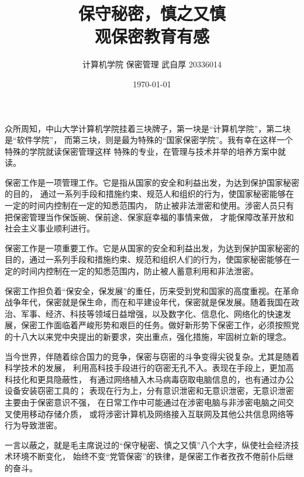 \documentclass[12pt]{article}
\title{\huge\textbf{保守秘密，慎之又慎} \\ \Large{观保密教育有感}}
\author{计算机学院 \hspace{1em} 保密管理 \hspace{1em} 武自厚 \hspace{1em} 20336014}
\date{\today}
\begin{document}
\maketitle

众所周知，中山大学计算机学院挂着三块牌子，第一块是“计算机学院”，第二块是“软件学院”，
而第三块，则是最为特殊的“国家保密学院”。我有幸在这样一个特殊的学院就读保密管理这样
特殊的专业，在管理与技术并举的培养方案中就读。

保密工作是一项管理工作。它是指从国家的安全和利益出发，为达到保护国家秘密的目的，
通过一系列手段和措施约束、规范人和组织的行为，使国家秘密能够在一定的时间内控制在一定的知悉范围内，
防止被非法泄密和使用。涉密人员只有把保密管理当作保饭碗、保前途、保家庭幸福的事情来做，
才能保障改革开放和社会主义事业顺利进行。

保密工作是一项重要工作。它是从国家的安全和利益出发，为达到保护国家秘密的目的，通过一系列手段和措施约束、规范和组织人们的行为，使国家秘密能够在一定的时间内控制在一定的知悉范围内，防止被人蓄意利用和非法泄密。

保密工作担负着“保安全，保发展”的重任，历来受到党和国家的高度重视。在革命战争年代，保密就是保生命，而在和平建设年代，保密就是保发展。随着我国在政治、军事、经济、科技等领域日益增强，以及数字化、信息化、网络化的快速发展，保密工作面临着严峻形势和艰巨的任务。做好新形势下保密工作，必须按照党的十八大以来党中央提出的新要求，突出重点，强化措施，牢固树立新的理念。

当今世界，伴随着综合国力的竞争，保密与窃密的斗争变得尖锐复杂。尤其是随着科学技术的发展，
利用高科技手段进行的窃密无孔不入。表现在手段上，更加高科技化和更具隐蔽性，
有通过网络植入木马病毒窃取电脑信息的，也有通过办公设备安装窃密工具的；
表现在行为上，分有意识泄密和无意识泄密，无意识泄密主要由于保密意识不强，
在日常工作中可能通过在涉密电脑与非涉密电脑之间交叉使用移动存储介质，
或将涉密计算机及网络接入互联网及其他公共信息网络等行为导致泄密。

一言以蔽之，就是毛主席说过的“保守秘密、慎之又慎”八个大字，纵使社会经济技术环境不断变化，
始终不变“党管保密”的铁律，是保密工作者孜孜不倦前仆后继的奋斗。
\end{document}
